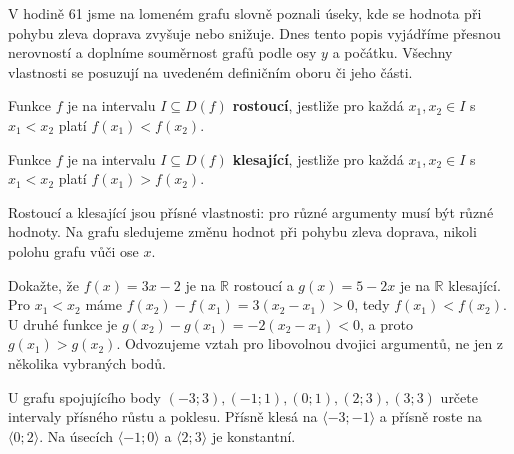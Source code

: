 \documentclass[11pt,a4paper]{article}
\begin{document}
V hodině 61 jsme na lomeném grafu slovně poznali úseky, kde se hodnota při pohybu zleva doprava zvyšuje nebo snižuje. Dnes tento popis vyjádříme přesnou nerovností a doplníme souměrnost grafů podle osy $y$ a počátku. Všechny vlastnosti se posuzují na uvedeném definičním oboru či jeho části.
\begin{definiceBox}
Funkce $f$ je na intervalu $I\subseteq D(f)$ \textbf{rostoucí}, jestliže pro každá $x_1,x_2\in I$ s $x_1<x_2$ platí $f(x_1)<f(x_2)$.
\end{definiceBox}
\begin{definiceBox}
Funkce $f$ je na intervalu $I\subseteq D(f)$ \textbf{klesající}, jestliže pro každá $x_1,x_2\in I$ s $x_1<x_2$ platí $f(x_1)>f(x_2)$.
\end{definiceBox}
Rostoucí a klesající jsou přísné vlastnosti: pro různé argumenty musí být různé hodnoty. Na grafu sledujeme změnu hodnot při pohybu zleva doprava, nikoli polohu grafu vůči ose $x$.
\begin{prikladReseniBox}
Dokažte, že $f(x)=3x-2$ je na $\mathbb R$ rostoucí a $g(x)=5-2x$ je na $\mathbb R$ klesající.
\tcblower
Pro $x_1<x_2$ máme $f(x_2)-f(x_1)=3(x_2-x_1)>0$, tedy $f(x_1)<f(x_2)$. U druhé funkce je $g(x_2)-g(x_1)=-2(x_2-x_1)<0$, a proto $g(x_1)>g(x_2)$. Odvozujeme vztah pro libovolnou dvojici argumentů, ne jen z několika vybraných bodů.
\end{prikladReseniBox}
\begin{center}
\end{center}
\begin{prikladReseniBox}
U grafu spojujícího body $(-3;3),(-1;1),(0;1),(2;3),(3;3)$ určete intervaly přísného růstu a poklesu.
\tcblower
Přísně klesá na $\langle-3;-1\rangle$ a přísně roste na $\langle0;2\rangle$. Na úsecích $\langle-1;0\rangle$ a $\langle2;3\rangle$ je konstantní.
\end{prikladReseniBox}
\end{document}
